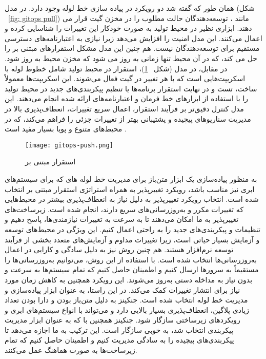 همان طور که گفته شد دو رویکرد در پیاده سازی خط لوله  وجود دارد. در مدل  
(شکل 
~\ref{fig: gitops pull})
مانند ، توسعه‌دهندگان حالت مطلوب را در مخزن گیت قرار می دهند. ابزاری نظیر  در محیط تولید به صورت خودکار این تغییرات را شناسایی کرده و اعمال می‌کنند. این مدل امنیت را افزایش می‌دهد زیرا نیازی به اعتبارنامه‌های دسترسی مستقیم برای توسعه‌دهندگان نیست. هم چنین این مدل مشکل استقرارهای مبتنی بر  را حل می کند، که در آن محیط تنها زمانی به روز می شود که مخزن محیط به روز شود. 
در مقابل، در مدل  (شکل 
~\ref{fig: gitops push})، استقرار در محیط تولید شامل خطوط لوله  با اسکریپت‌هایی است که با هر تغییر در گیت فعال می‌شوند. این اسکریپت‌ها معمولاً ساخت، تست و در نهایت استقرار برنامه‌ها یا تنظیم پیکربندی‌های جدید در محیط تولید را با استفاده از ابزارهای خط فرمان و اعتبارنامه‌های ارائه شده انجام می‌دهند. این مدل کنترل دقیق‌تر بر فرآیند استقرار، اعمال سریع تغییرات، انعطاف‌پذیری بالا در مدیریت سناریوهای پیچیده و پشتیبانی بهتر از تغییرات جزئی را فراهم می‌کند، که در محیط‌های متنوع و پویا بسیار مفید است \cite{Devopsgitops}.
\begin{figure}[t]
	\centering
	\texttt{[image: gitops-push.png]}
	\caption{استقرار مبتنی بر }
	\label{fig: gitops push}
\end{figure}

به منظور پیاده‌سازی یک ابزار متن‌باز برای مدیریت خط لوله های  که برای سیستم‌های ابری نیز مناسب باشد،  رویکرد تغییرپذیر  به همراه استراتژی استقرار مبتنی بر  انتخاب شده است. انتخاب رویکرد تغییرپذیر به دلیل نیاز به انعطاف‌پذیری بیشتر در محیط‌هایی که تغییرات مکرر و به‌روزرسانی‌های سریع دارند، انجام شده است. زیرساخت‌های تغییرپذیر به ما امکان می‌دهند تا به سرعت به تغییرات نیازمندی‌ها، پاسخ دهیم و تنظیمات و پیکربندی‌های جدید را به راحتی اعمال کنیم. این ویژگی در محیط‌های توسعه و آزمایش بسیار حیاتی است، زیرا تغییرات مداوم و آزمایش‌های متعدد بخشی از فرآیند توسعه نرم‌افزار هستند. هم چنین روش  نیز به دلیل سادگی و کارایی در اعمال به‌روزرسانی‌ها انتخاب شده است. با استفاده از این روش، می‌توانیم به‌روزرسانی‌ها را مستقیماً به سرورها ارسال کنیم و اطمینان حاصل کنیم که تمام سیستم‌ها به سرعت و بدون نیاز به مداخله دستی به‌روز می‌شوند. این رویکرد همچنین به کاهش زمان مورد نیاز برای انتشار تغییرات کمک می‌کند. در این راستا،  به عنوان ابزار پیاده‌سازی و مدیریت خط لوله  انتخاب شده است. جنکینز به دلیل متن‌باز بودن و دارا بودن تعداد زیادی پلاگین، انعطاف‌پذیری بسیار بالایی دارد و می‌تواند با انواع سیستم‌های ابری و رویکردهای زیرساختی سازگار شود. جنکینز همچنین با  که به عنوان ابزار مدیریت پیکربندی انتخاب شد، به خوبی سازگار است. این ترکیب به ما اجازه می‌دهد تا پیکربندی‌های پیچیده را به سادگی مدیریت کنیم و اطمینان حاصل کنیم که تمام زیرساخت‌ها به صورت هماهنگ عمل می‌کنند.
